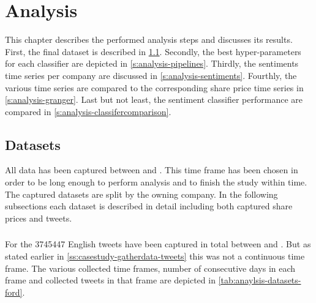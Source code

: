 
\chapter{Analysis}
\label{c:analysis}

This chapter describes the performed analysis steps and discusses its results.
First, the final dataset is described in \cref{s:analysis-datasets}.
Secondly, the best hyper-parameters for each classifier are depicted in \cref{s:analysis-pipelines}.
Thirdly, the sentiments time series per company are discussed in \cref{s:analysis-sentiments}.
Fourthly, the various time series are compared to the corresponding share price time series in \cref{s:analysis-granger}.
Last but not least, the sentiment classifier performance are compared in \cref{s:analysis-classifercomparison}.

\section{Datasets}
\label{s:analysis-datasets}

All data has been captured between  and .
This time frame has been chosen in order to be long enough to perform analysis and to finish the study within time.
The captured datasets are split by the owning company.
In the following subsections each dataset is described in detail including both captured share prices and tweets.

\subsection{\ford}
\label{ss:analysis-datasets-ford}


For the \ford{} \num{3745447} English tweets have been captured in total between  and .
But as stated earlier in \cref{ss:casestudy-gatherdata-tweets} this was not a continuous time frame.
The various collected time frames, number of consecutive days in each frame and collected tweets in that frame are depicted in \cref{tab:anaylsis-datasets-ford}.

